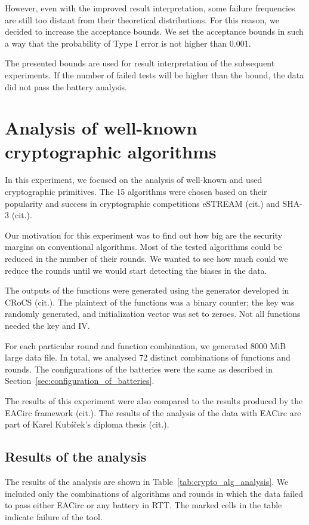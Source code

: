 \documentclass[
  digital,  	%
  color,		%
  oneside,   	%
  12pt,
  nocover,
  notable,
  nolof,
  nolot,
]{fithesis3}
\theoremstyle{definition}
\theoremstyle{remark}
\begin{document}
However, even with the improved result interpretation, some failure frequencies are still too distant from their theoretical distributions. For this reason, we decided to increase the acceptance bounds. We set the acceptance bounds in such a way that the probability of Type I error is not higher than 0.001.

The presented bounds are used for result interpretation of the subsequent experiments. If the number of failed tests will be higher than the bound, the data did not pass the battery analysis.

\section{Analysis of well-known cryptographic algorithms}
In this experiment, we focused on the analysis of well-known and used cryptographic primitives. The 15 algorithms were chosen based on their popularity and success in cryptographic competitions eSTREAM (cit.) and SHA-3 (cit.).

Our motivation for this experiment was to find out how big are the security margins on conventional algorithms. Most of the tested algorithms could be reduced in the number of their rounds. We wanted to see how much could we reduce the rounds until we would start detecting the biases in the data.

The outputs of the functions were generated using the generator developed in CRoCS (cit.). The plaintext of the functions was a binary counter; the key was randomly generated, and initialization vector was set to zeroes. Not all functions needed the key and IV. 

For each particular round and function combination, we generated 8000 MiB large data file. In total,  we analysed 72 distinct combinations of functions and rounds. The configurations of the batteries were the same as described in Section~\ref{sec:configuration_of_batteries}. 

The results of this experiment were also compared to the results produced by the EACirc framework (cit.). The results of the analysis of the data with EACirc are part of Karel Kubíček's diploma thesis (cit.).

\subsection{Results of the analysis}
The results of the analysis are shown in Table~\ref{tab:crypto_alg_analysis}. We included only the combinations of algorithms and rounds in which the data failed to pass either EACirc or any battery in RTT. The marked cells in the table indicate failure of the tool. 
\end{document}
